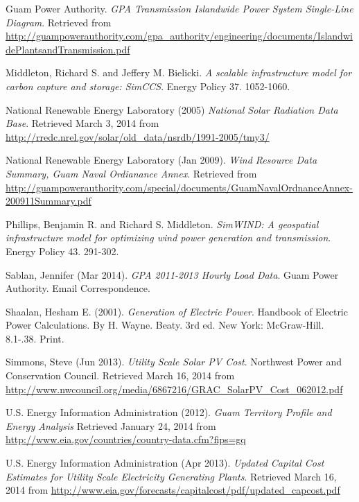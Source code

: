 \documentclass[12pt,letterpaper,fleqn]{article}
\begin{document}
\begin{thebibliography}{99}
  Guam Power Authority.
  \emph{GPA Transmission Islandwide Power System Single-Line Diagram}.
  Retrieved from 
  \url{http://guampowerauthority.com/gpa_authority/engineering/documents/IslandwidePlantsandTransmission.pdf}

  Middleton, Richard S. and Jeffery M. Bielicki.
  \emph{A scalable infrastructure model for carbon capture and
    storage: SimCCS}.
  Energy Policy 37.
  1052-1060.

  National Renewable Energy Laboratory (2005)
  \emph{National Solar Radiation Data Base}.
  Retrieved March 3, 2014 from
  \url{http://rredc.nrel.gov/solar/old_data/nsrdb/1991-2005/tmy3/}

  National Renewable Energy Laboratory (Jan 2009).
  \emph{Wind Resource Data Summary, Guam Naval Ordianance Annex}.
  Retrieved from
  \url{http://guampowerauthority.com/special/documents/GuamNavalOrdnanceAnnex-200911Summary.pdf}

  Phillips, Benjamin R. and Richard S. Middleton.
  \emph{SimWIND: A geospatial infrastructure model for optimizing wind
    power generation and transmission}.
  Energy Policy 43.
  291-302.

  Sablan, Jennifer (Mar 2014).
  \emph{GPA 2011-2013 Hourly Load Data}.
  Guam Power Authority.
  Email Correspondence.

  Shaalan, Hesham E. (2001).
  \emph{Generation of Electric Power}.
  Handbook of Electric Power Calculations.
  By H. Wayne. Beaty.
  3rd ed. New York: McGraw-Hill.
  8.1-.38.
  Print.

  Simmons, Steve (Jun 2013).
  \emph{Utility Scale Solar PV Cost}.
  Northwest Power and Conservation Council.
  Retrieved March 16, 2014 from
  \url{http://www.nwcouncil.org/media/6867216/GRAC_SolarPV_Cost_062012.pdf}

  U.S. Energy Information Administration (2012).
  \emph{Guam Territory Profile and Energy Analysis}
  Retrieved January 24, 2014 from
  \url{http://www.eia.gov/countries/country-data.cfm?fips=gq}

  U.S. Energy Information Administration (Apr 2013).
  \emph{Updated Capital Cost Estimates for Utility Scale Electricity
    Generating Plants}.
  Retrieved March 16, 2014 from
  \url{http://www.eia.gov/forecasts/capitalcost/pdf/updated_capcost.pdf}

\end{thebibliography}


\end{document}
